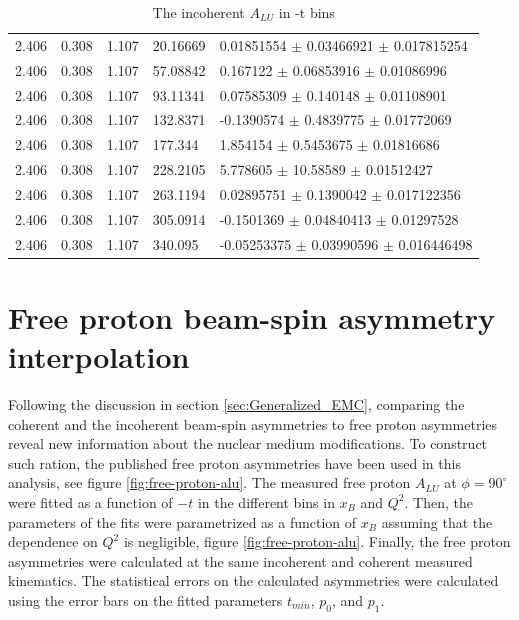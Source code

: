 \begin{table}[!h]
\begin{center}
\begin{tabular}{||l|l|l|l|l||}
   2.406 & 0.308 & 1.107&    20.16669  &  0.01851554   $\pm$ 0.03466921    $\pm$ 0.017815254  \\
   2.406 & 0.308 & 1.107&    57.08842  &  0.167122     $\pm$ 0.06853916    $\pm$ 0.01086996   \\
   2.406 & 0.308 & 1.107&    93.11341  &  0.07585309   $\pm$ 0.140148      $\pm$ 0.01108901   \\
   2.406 & 0.308 & 1.107&    132.8371  &  -0.1390574   $\pm$ 0.4839775     $\pm$ 0.01772069   \\
   2.406 & 0.308 & 1.107&    177.344   &  1.854154     $\pm$ 0.5453675     $\pm$ 0.01816686   \\ 
   2.406 & 0.308 & 1.107&    228.2105  &  5.778605     $\pm$ 10.58589      $\pm$ 0.01512427   \\
   2.406 & 0.308 & 1.107&    263.1194  &  0.02895751   $\pm$ 0.1390042     $\pm$ 0.017122356  \\
   2.406 & 0.308 & 1.107&    305.0914  &  -0.1501369   $\pm$ 0.04840413    $\pm$ 0.01297528   \\
   2.406 & 0.308 & 1.107&    340.095   &  -0.05253375  $\pm$ 0.03990596    $\pm$ 0.016446498  \\
 \hline
 \hline
 \end{tabular}
 \caption{The incoherent $A_{LU}$ in -t bins}
 \label{table:InCoh_t_BSA}
 \end{center}
\end{table}

\chapter{Free proton beam-spin asymmetry interpolation} 
\label{app:free-proton-alu}
Following the discussion in section \ref{sec:Generalized_EMC}, comparing the 
coherent and the incoherent beam-spin asymmetries to free proton asymmetries 
reveal new information about the nuclear medium modifications. To construct 
such ration, the published free proton asymmetries \cite{FX_BSA} have been used 
in this analysis, see figure \ref{fig:free-proton-alu}. The measured free 
proton $A_{LU}$ at $\phi = 90^{\circ}$ were fitted as a function of $-t$ in the 
different bins in $x_B$ and $Q^2$. Then, the parameters of the fits were 
parametrized as a function of $x_B$ assuming that the dependence on $Q^2$ is 
negligible, figure \ref{fig:free-proton-alu}. Finally, the free proton 
asymmetries were calculated at the same incoherent and coherent measured 
kinematics. The statistical errors on the calculated asymmetries were 
calculated using the error bars on the fitted parameters $t_{min}$, $p_0$, and 
$p_1$.\\ 


